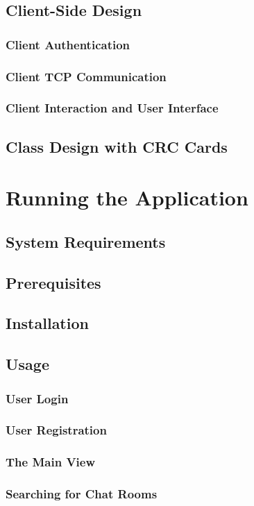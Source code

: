 \documentclass[a4paper,11pt]{article}
\begin{document}
\subsection{Client-Side Design}
\subsubsection{Client Authentication}
\subsubsection{Client TCP Communication}
\subsubsection{Client Interaction and User Interface}
\subsection{Class Design with CRC Cards}

\section{Running the Application}
\subsection{System Requirements}
\subsection{Prerequisites}
\subsection{Installation}
\subsection{Usage}
\subsubsection{User Login}
\subsubsection{User Registration}
\subsubsection{The Main View}
\subsubsection{Searching for Chat Rooms}
\end{document}
